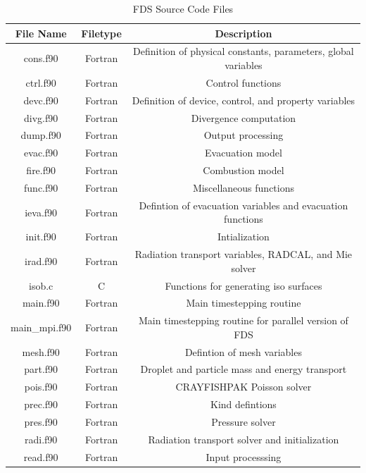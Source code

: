 \documentclass[11pt]{book}
\begin{document}
\begin{table}[ht]
\begin{center}
\caption{FDS Source Code Files}
\label{tbl:sourcecodefiles}
\begin{tabular}{|c|c|c|}
\hline
File Name    & Filetype & Description    \\ \hline 
cons.f90     & Fortran  & Definition of physical constants, parameters, global variables \\ \hline 
ctrl.f90     & Fortran  & Control functions  \\ \hline 
devc.f90     & Fortran  & Definition of device, control, and property variables \\ \hline 
divg.f90     & Fortran  & Divergence computation \\ \hline 
dump.f90     & Fortran  & Output processing \\ \hline 
evac.f90     & Fortran  & Evacuation model \\ \hline 
fire.f90     & Fortran  & Combustion model \\ \hline 
func.f90     & Fortran  & Miscellaneous functions \\ \hline 
ieva.f90     & Fortran  & Defintion of evacuation variables and evacuation functions \\ \hline 
init.f90     & Fortran  & Intialization \\ \hline 
irad.f90     & Fortran  & Radiation transport variables, RADCAL, and Mie solver \\ \hline 
isob.c       & C        & Functions for generating iso surfaces \\ \hline 
main.f90     & Fortran  & Main timestepping routine \\ \hline 
main\_mpi.f90 & Fortran  & Main timestepping routine for parallel version of FDS \\ \hline 
mesh.f90     & Fortran  & Defintion of mesh variables \\ \hline 
part.f90     & Fortran  & Droplet and particle mass and energy transport \\ \hline 
pois.f90     & Fortran  & CRAYFISHPAK Poisson solver \\ \hline 
prec.f90     & Fortran  & Kind defintions \\ \hline 
pres.f90     & Fortran  & Pressure solver \\ \hline 
radi.f90     & Fortran  & Radiation transport solver and initialization  \\ \hline 
read.f90     & Fortran  & Input processsing \\ \hline 

\end{tabular}
\end{center}
\end{table}
\end{document}
